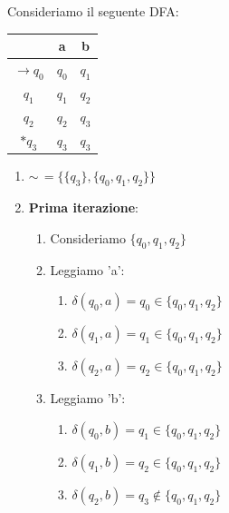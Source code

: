 \documentclass[12pt, a4paper]{report}
\begin{document}
                \begin{example}
                    Consideriamo il seguente DFA:
                    \begin{center}
                        \begin{tabular}{|c|c|c|}
                            \hline
                            & \textbf{a} & \textbf{b}\\
                            \hline
                            $\to q_0$ & $q_0$ & $q_1$ \\
                            \hline
                            $q_1$ & $q_1$ & $q_2$ \\
                            \hline
                            $q_2$ & $q_2$ & $q_3$ \\
                            \hline
                            $*q_3$ & $q_3$ & $q_3$ \\
                            \hline
                        \end{tabular}
                    \end{center}
                    \begin{enumerate}
                        \item $\sim\,=\{\{q_3\},\{q_0,q_1,q_2\}\}$
                        \item \textbf{Prima iterazione}: \begin{enumerate}
                            \item Consideriamo $\{q_0,q_1,q_2\}$
                            \item Leggiamo 'a': \begin{enumerate}
                                \item $\delta(q_0,a)=q_0 \in \{q_0,q_1,q_2\}$
                                \item $\delta(q_1,a)=q_1 \in \{q_0,q_1,q_2\}$
                                \item $\delta(q_2,a)=q_2 \in \{q_0,q_1,q_2\}$
                            \end{enumerate}
                            \item Leggiamo 'b': \begin{enumerate}
                                \item $\delta(q_0,b)=q_1 \in \{q_0,q_1,q_2\}$
                                \item $\delta(q_1,b)=q_2 \in \{q_0,q_1,q_2\}$
                                \item $\delta(q_2,b)=q_3 \notin \{q_0,q_1,q_2\}$

\end{enumerate}
\end{enumerate}
\end{enumerate}
\end{example}
\end{document}

